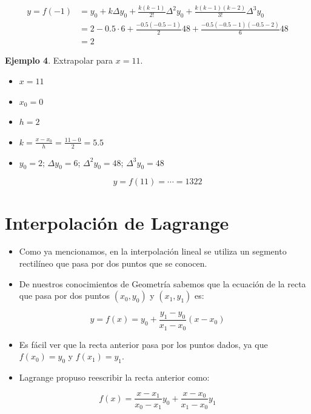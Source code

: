 \documentclass[openany]{book}
\providecommand{\tightlist}{%
  \setlength{\itemsep}{0pt}\setlength{\parskip}{0pt}}
\begin{document}
\[
\begin{aligned}
y = f(-1) &= y_0 + k \Delta y_0 + \frac{k(k-1)}{2!}\Delta^2 y_0 + \frac{k(k-1)(k-2)}{3!}\Delta^3 y_0\\
  & = 2 - 0.5 \cdot 6 + \frac{- 0.5 (- 0.5-1)}{2} 48 + \frac{- 0.5 (- 0.5-1)(- 0.5-2)}{6} 48 \\
  & = 2
\end{aligned}
\]

\textbf{Ejemplo 4}. Extrapolar para \(x = 11\).

\begin{itemize}
\tightlist
\item
  \(x = 11\)
\item
  \(x_0 = 0\)
\item
  \(h = 2\)
\item
  \(k = \frac{x-x_0}{h} = \frac{11-0}{2} = 5.5\)
\item
  \(y_0 = 2\); \(\Delta y_0 = 6\); \(\Delta^2 y_0 = 48\); \(\Delta^3 y_0 = 48\)
\end{itemize}

\[
y = f(11) = \cdots = 1322
\]

\hypertarget{interpolaciuxf3n-de-lagrange}{%
\section{Interpolación de Lagrange}\label{interpolaciuxf3n-de-lagrange}}

\begin{itemize}
\tightlist
\item
  Como ya mencionamos, en la interpolación lineal se utiliza un segmento rectilíneo que pasa por dos puntos que se conocen.
\item
  De nuestros conocimientos de Geometría sabemos que la ecuación de la recta que pasa por dos puntos \((x_0, y_0)\) y \((x_1, y_1)\) es:
\end{itemize}

\[
y = f(x) = y_0 + \frac{y_1 - y_0}{x_1 - x_0} (x - x_0)
\]

\begin{itemize}
\item
  Es fácil ver que la recta anterior pasa por los puntos dados, ya que \(f(x_0) = y_0\) y \(f(x_1) = y_1\).
\item
  Lagrange propuso reescribir la recta anterior como:
\end{itemize}

\[
f(x) = \frac{x - x_1}{x_0 - x_1} y_0 + \frac{x - x_0}{x_1 - x_0} y_1
\]
\end{document}
